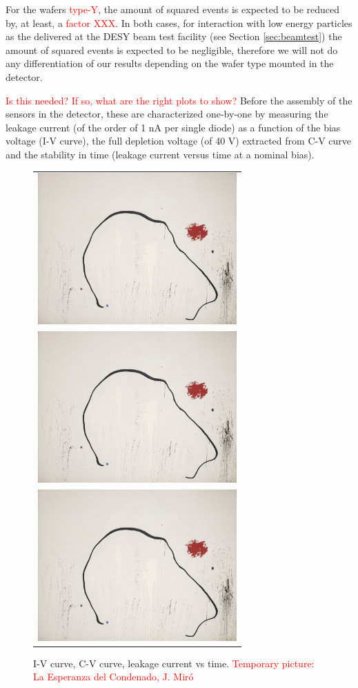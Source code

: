 \documentclass[a4paper,11pt]{article}
\newcommand{\todo}[1]{\textcolor{red}{{#1}}}
\begin{document}
For the wafers \todo{type-Y}, the amount of squared events is expected to be reduced by, at least, a \todo{factor XXX}. In both cases, 
for interaction with low energy particles as the delivered at the DESY beam test facility (see Section \ref{sec:beamtest}) the
amount of squared events is expected to be negligible, therefore we will not do any differentiation 
of our results depending on the wafer type mounted in the detector.

\todo{ Is this needed? If so, what are the right plots to show?} Before the assembly of the sensors in the detector, these are characterized one-by-one by measuring the leakage current (of the order of 1 nA per single diode) 
as a function of the bias voltage (I-V curve), the full depletion voltage (of 40 V) extracted from C-V curve and
the stability in time (leakage current versus time at a nominal bias).

\begin{figure}[!t]
\centering
\begin{tabular}{l}
  \includegraphics[width=3.0in]{figs/test.jpg} \\
  \includegraphics[width=3.0in]{figs/test.jpg} \\
  \includegraphics[width=3.0in]{figs/test.jpg}
\end{tabular}
\caption{I-V curve, C-V curve, leakage current vs time. \todo{Temporary picture: La Esperanza del Condenado, J. Miró}}
\label{shortslab}
\end{figure}
\end{document}
